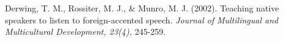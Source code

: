 

Derwing, T. M., Rossiter, M. J., \& Munro, M. J. (2002). Teaching native speakers to listen to foreign-accented speech. \textit{Journal of Multilingual and Multicultural Development, 23(4),} 245-259.

